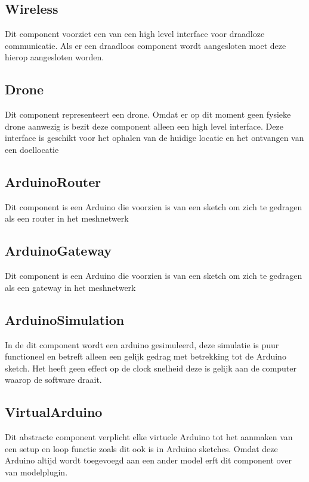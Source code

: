 \documentclass[a4paper, 11pt, oneside]{report}
\begin{document}
\subsection{Wireless}
\label{architectural:subcomponenten:Wireless}
Dit component voorziet een  van een high level interface voor draadloze communicatie.
Als er een draadloos component wordt aangesloten moet deze hierop aangesloten worden. 

\subsection{Drone}
\label{architectural:subcomponenten:Drone}
Dit component representeert een drone. Omdat er op dit moment geen fysieke drone aanwezig is bezit deze component alleen een high level interface.
Deze interface is geschikt voor het ophalen van de huidige locatie en het ontvangen van een doellocatie

\subsection{ArduinoRouter}
\label{architectural:subcomponenten:ArduinoRouter}
Dit component is een Arduino die voorzien is van een sketch om zich te gedragen als een router in het meshnetwerk
\subsection{ArduinoGateway}
\label{architectural:subcomponenten:ArduinoGateway}
Dit component is een Arduino die voorzien is van een sketch om zich te gedragen als een gateway in het meshnetwerk

\subsection{ArduinoSimulation}
\label{architectural:subcomponenten:ArduinoSimulation}
In de dit component wordt een arduino gesimuleerd, deze simulatie is puur functioneel en betreft alleen een gelijk gedrag met betrekking tot de Arduino sketch. 
Het heeft geen effect op de clock snelheid deze is gelijk aan de computer waarop de software draait. 

\subsection{VirtualArduino}
\label{architectural:subcomponenten:VirtualArduino}
Dit abstracte component verplicht elke virtuele Arduino tot het aanmaken van een setup en loop functie zoals dit ook is in Arduino sketches.
Omdat deze Arduino altijd wordt toegevoegd aan een ander model erft dit component over van modelplugin.    
 
\end{document}
